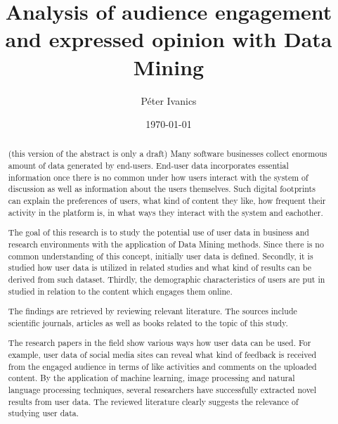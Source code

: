 \documentclass[english]{tktltiki}
\begin{document}
\onehalfspacing

\title{Analysis of audience engagement and expressed opinion with Data Mining}
\author{P\'eter Ivanics}

\date{\today}

\maketitle


\begin{abstract}
(this version of the abstract is only a draft)
Many software businesses collect enormous amount of data generated by end-users. End-user data incorporates essential information once there is no common under
 how users interact with the system of discussion as well as information about the users themselves. Such digital footprints can explain the preferences of users, what kind of content they like, how frequent their activity in the platform is, in what ways they interact with the system and eachother.

The goal of this research is to study the potential use of user data in business and research environments with the application of Data Mining methods. Since there is no common understanding of this concept, initially user data is defined. Secondly, it is studied how user data is utilized in related studies and what kind of results can be derived from such dataset. Thirdly, the demographic characteristics of users are put in studied in relation to the content which engages them online.

The findings are retrieved by reviewing relevant literature. The sources include scientific journals, articles as well as books related to the topic of this study. 

The research papers in the field show various ways how user data can be used. For example, user data of social media sites can reveal what kind of feedback is received from the engaged audience in terms of like activities and comments on the uploaded content. By the application of machine learning, image processing and natural language processing techniques, several researchers have successfully extracted novel results from user data. The reviewed literature clearly suggests the relevance of studying user data.
 
\end{abstract}
\end{document}
